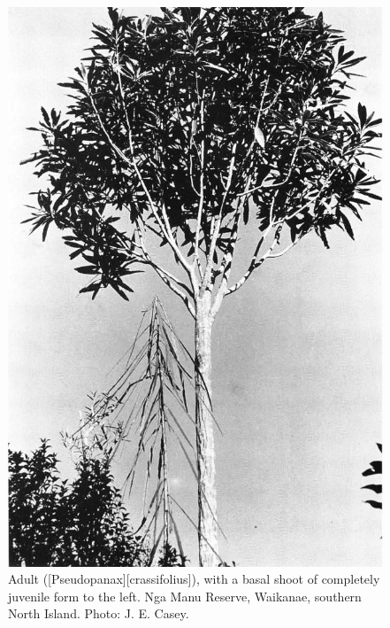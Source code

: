 \begin{figure}[!t]
	\begin{minipage}[t]{\textwidth}
		\begin{minipage}[t]{(\textwidth-\fgap) * \real{0.491}}
			\centering
			\includegraphics[width=\textwidth]{graphics/figure20lancewood.jpg}
			\caption[Adult lancewood]{Adult  ([Pseudopanax][crassifolius]), with a basal shoot of completely juvenile form to the left.
			Nga Manu Reserve, Waikanae, southern North Island.
			Photo: J. E. Casey.}%
			\label{fig:20lancewood}
		\end{minipage}\hspace{\fgap}%
		\begin{minipage}[t]{(\textwidth-\fgap) * \real{0.509}}

\end{minipage}
\end{minipage}
\end{figure}
